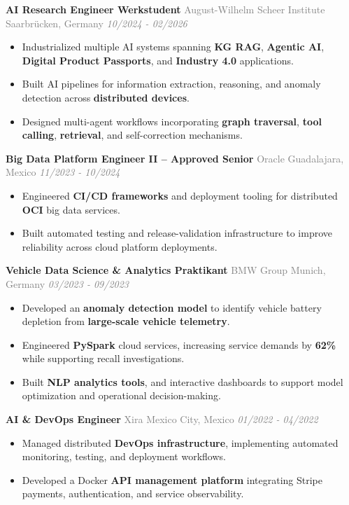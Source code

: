 \documentclass[a4paper]{article}
\newcommand{\entrytitle}[1]{{\fontsize{12pt}{13.2pt}\selectfont\textbf{#1}}}
\begin{document}
\vspace{0.1cm}
\entrytitle{AI Research Engineer Werkstudent} {\small \textcolor{graytext}{August-Wilhelm Scheer Institute} \hfill \textcolor{graytext}{Saarbrücken, Germany \quad \textit{10/2024 - 02/2026}}}
\begin{itemize}
  \item Industrialized multiple AI systems spanning \textbf{KG RAG}, \textbf{Agentic AI}, \textbf{Digital Product Passports}, and \textbf{Industry 4.0} applications.
  \item Built AI pipelines for information extraction, reasoning, and anomaly detection across \textbf{distributed devices}.
  \item Designed multi-agent workflows incorporating \textbf{graph traversal}, \textbf{tool calling}, \textbf{retrieval}, and self-correction mechanisms.
\end{itemize}

\vspace{0.1cm}
\entrytitle{Big Data Platform Engineer II -- Approved Senior} {\small \textcolor{graytext}{Oracle} \hfill \textcolor{graytext}{Guadalajara, Mexico \quad \textit{11/2023 - 10/2024}}}
\begin{itemize}
  \item Engineered \textbf{CI/CD frameworks} and deployment tooling for distributed \textbf{OCI} big data services.
  \item Built automated testing and release-validation infrastructure to improve reliability across cloud platform deployments.
\end{itemize}

\vspace{0.1cm}
\entrytitle{Vehicle Data Science \& Analytics Praktikant} {\small \textcolor{graytext}{BMW Group} \hfill \textcolor{graytext}{Munich, Germany \quad \textit{03/2023 - 09/2023}}}
\begin{itemize}
  \item Developed an \textbf{anomaly detection model} to identify vehicle battery depletion from \textbf{large-scale vehicle telemetry}.
  \item Engineered \textbf{PySpark} cloud services, increasing service demands by \textbf{62\%} while supporting recall investigations.
  \item Built \textbf{NLP analytics tools}, and interactive dashboards to support model optimization and operational decision-making.
\end{itemize}

\vspace{0.1cm}
\entrytitle{AI \& DevOps Engineer} {\small \textcolor{graytext}{Xira} \hfill \textcolor{graytext}{Mexico City, Mexico \quad \textit{01/2022 - 04/2022}}}
\begin{itemize}
  \item Managed distributed \textbf{DevOps infrastructure}, implementing automated monitoring, testing, and deployment workflows.
  \item Developed a Docker \textbf{API management platform} integrating Stripe payments, authentication, and service observability.
\end{itemize}
\end{document}
